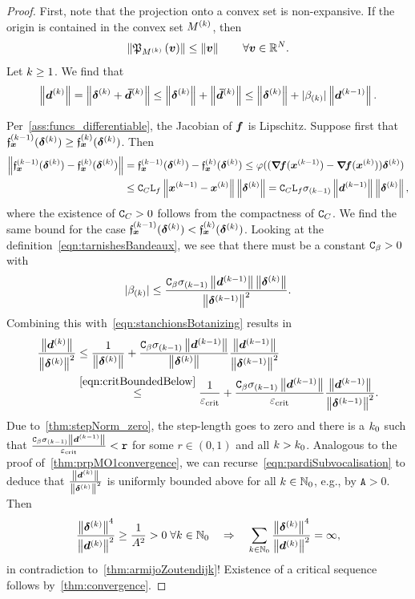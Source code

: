 \documentclass{article}
\theoremstyle{plain}
\theoremstyle{definition}
\begin{document}
\begin{proof}
	First, note that the projection onto a convex set is non-expansive.
	If the origin is contained in the convex set $M\KK$,
	then
	$$
	\norm{\proj{\ve v}{M\KK}} \leq \norm{\ve v}
	\qquad \forall \ve{v}\in \RRin.
	$$
	Let $\kk \geq 1$. We find that
	\begin{equation}	
	\norm{\vdK}
	=
	\norm{\sdK + \ve{\bar{\vd}}\KK}
	\leq
	\norm{\sdK} + 
	\norm{\ve{\bar{\vd}}\KK}
	\leq
	\norm{\sdK} + 
	|\beta\kK|
	\norm{\vd\KKp}.
	\label{eqn:stanchionsBotanizing}
	\end{equation}

	Per~\cref{ass:funcs_differentiable}, the Jacobian of $\vf$
	is Lipschitz.
	Suppose first that $\funcXKp(\sdK) \geq \funcXK(\sdK)$.
	Then
	\begin{align*}
	\norm{\funcXKp(\sdK) - \funcXK(\sdK)}
	&=
	{\funcXKp(\sdK) - \funcXK(\sdK)}
	\leq
	\phiC((\jacf(\vxKp) - \jacf(\vxK))\sdK)
	\\
	&\leq
	\Const_C \lipConstf \norm{\vxKp - \vxK} \norm{\sdK}
	=
	\Const_C \lipConstf \szKp \norm{\vdKp}\norm{\sdK},
	\end{align*}
	where the existence of $\Const_C>0$ follows from the 
	compactness of $\Const_C$.
	We find the same bound for the case $\funcXKp(\sdK) < \funcXK(\sdK)$.
	Looking at the definition~\eqref{eqn:tarnishesBandeaux}, 
	we see that there must be a constant $\Const_\beta > 0$ with
	$$
	|\beta\kK|
	\leq
	\frac{\Const_\beta
	\szKp \norm{\vdKp}\norm{\sdK}}
	{
		\norm{\sdKp}^2
	}.
	$$
	Combining this with~\eqref{eqn:stanchionsBotanizing} results in
	\begin{align}
		\frac{\norm{\vdK}}{\norm{\sdK}^2}
		&\leq
		\frac{1}{\norm{\sdK}}
		+
		\frac{
			\Const_\beta
			\szKp \norm{\vdKp}
		}{
			\norm{\sdK}
		}
		\frac{\norm{\vdKp}}{\norm{\sdKp}^2}
		\nonumber
		\\
		&\stackrel{\eqref{eqn:critBoundedBelow}}\leq
		\frac{1}{\critBound}
		+
		\frac{
			\Const_\beta
			\szKp \norm{\vdKp}
		}{
			\critBound
		}
		\frac{\norm{\vdKp}}{\norm{\sdKp}^2}
		.
		\label{eqn:pardiSubvocalisation}
	\end{align}
	Due to~\cref{thm:stepNorm_zero},
	the step-length goes to zero and there is a $\kk_0$ such that
	$\frac{
			\Const_\beta
			\szKp \norm{\vdKp}
		}{
			\critBound
		}<\mathtt{r}$
	for some $r\in (0,1)$ and all $\kk>\kk_0$.
	Analogous to the proof of~\cref{thm:prpMO1convergence},
	we can recurse~\eqref{eqn:pardiSubvocalisation} to deduce that $\frac{\norm{\vdK}}{\norm{\sdK}^2}$
	is uniformly bounded above for all $\kk\in\NN_0$,
	e.g., by $\mathtt A > 0$.
	Then
	$$
	\frac{\norm{\sdK}^4}{\norm{\vdK}^2}
	\geq \frac{1}{A^2} > 0
	\; \forall \kk \in \NN_0
	\quad\Rightarrow\quad
	\sum_{\kk\in\NN_0}
	\frac{\norm{\sdK}^4}{\norm{\vdK}^2}
	= 
	\infty,
	$$
	in contradiction to~\cref{thm:armijoZoutendijk}!
	Existence of a critical sequence follows by~\cref{thm:convergence}.
\end{proof}


\end{document}
